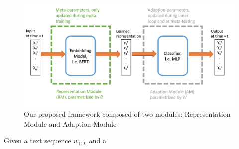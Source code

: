 
\begin{figure}[ht]
\centering
    \includegraphics[scale=0.6]{imgs/framework.jpg}
    \caption{Our proposed framework composed of two modules: Representation Module and Adaption Module}
    \label{img:1}
\end{figure}

Given a text sequence $w_{1:L}$ and a 


%
%
